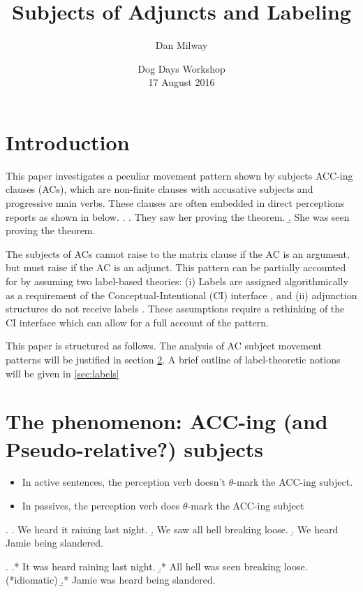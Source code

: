 \documentclass[letterpaper]{article}
\title{Subjects of Adjuncts and Labeling}
\author{Dan Milway}
\date{Dog Days Workshop\\17 August 2016}
\begin{document}
\maketitle
\section{Introduction}
This paper investigates a peculiar movement pattern shown by subjects ACC-ing clauses (ACs), which are non-finite clauses with accusative subjects and progressive main verbs.
These clauses are often embedded in direct perceptions reports as shown in \Last below.
\ex. 
\a. They saw her proving the theorem.
\b. She was seen proving the theorem.

The subjects of ACs cannot raise to the matrix clause if the AC is an argument, but must raise if the AC is an adjunct.
This pattern can be partially accounted for by assuming two label-based theories: (i) Labels are assigned algorithmically as a requirement of the Conceptual-Intentional (CI) interface \parencite{chomsky2013problems,chomsky2015problems}, and (ii) adjunction structures do not receive labels \parencite{chametzky1996theory,hornstein2009theory}.
These assumptions require a rethinking of the CI interface which can allow for a full account of the pattern.

This paper is structured as follows.
The analysis of AC subject movement patterns will be justified in section \ref{sec:analysis}.
A brief outline of label-theoretic notions will be given in \ref{sec:labels}
\section{The phenomenon: ACC-ing (and Pseudo-relative?) subjects}\label{sec:analysis}
\begin{itemize}
  \item In active sentences, the perception verb doesn't $\theta$-mark the ACC-ing subject.
  \item In passives, the perception verb does $\theta$-mark the ACC-ing subject
\end{itemize}
\ex.
\a. We heard it raining last night.
\b. We saw all hell breaking loose.
\b. We heard Jamie being slandered.

\ex.
\a.* It was heard raining last night.
\b.* All hell was seen breaking loose. (*idiomatic)
\b.* Jamie was heard being slandered.
\end{document}
